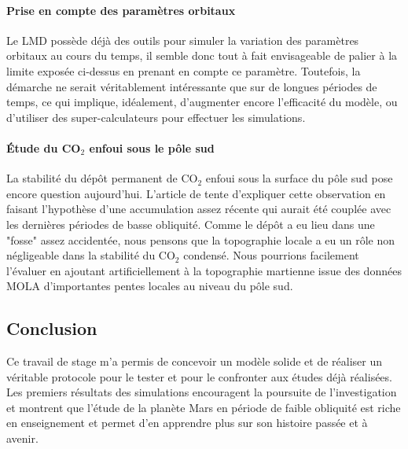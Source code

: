 \documentclass[11pt,a4paper]{article}
\begin{document}
\paragraph{Prise en compte des paramètres orbitaux \\}
Le LMD possède déjà des outils pour simuler la variation des paramètres orbitaux au cours du temps, il semble donc tout à fait envisageable de palier à la limite exposée ci-dessus en prenant en compte ce paramètre. Toutefois, la démarche ne serait véritablement intéressante que sur de longues périodes de temps, ce qui implique, idéalement, d'augmenter encore l'efficacité du modèle, ou d'utiliser des super-calculateurs pour effectuer les simulations. \\

\paragraph{\' Etude du CO$_2$ enfoui sous le pôle sud \\}
La stabilité du dépôt permanent de CO$_2$ enfoui sous la surface du pôle sud  pose encore question aujourd'hui. L'article de \cite{Bier:16} tente d'expliquer cette observation en faisant l'hypothèse d'une accumulation assez récente qui aurait été couplée avec les dernières périodes de basse obliquité. Comme le dépôt a eu lieu dans une "fosse" assez accidentée, nous pensons que la topographie locale a eu un rôle non négligeable dans la stabilité du CO$_2$ condensé. Nous pourrions facilement l'évaluer en ajoutant artificiellement à la topographie martienne issue des données MOLA d'importantes pentes locales au niveau du pôle sud. \\

\subsection{Conclusion}
Ce travail de stage m'a permis de concevoir un modèle solide et de réaliser un véritable protocole pour le tester et pour le confronter aux études déjà réalisées. Les premiers résultats des simulations encouragent la poursuite de l'investigation et montrent que l'étude de la planète Mars en période de faible obliquité est riche en enseignement et permet d'en apprendre plus sur son histoire passée et à avenir.

\clearpage


\nocite{Forg:99,Forg:06,Forg:06book,Forg:08mamo,Ahar:06,Bert:16,Bert:18,Forg:17book,Forg:98,Ahar:06}


\end{document}
